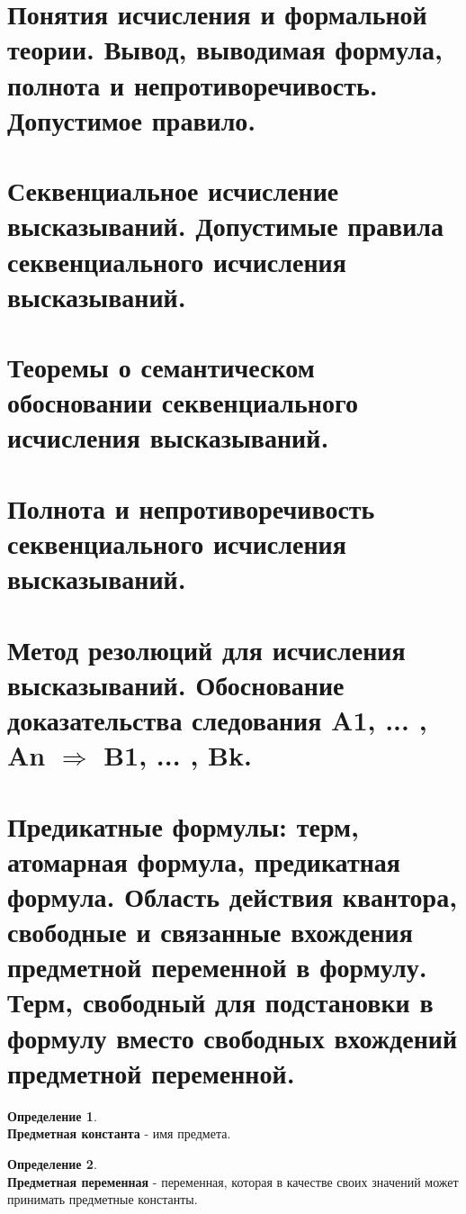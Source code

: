 \documentclass[a4paper,12pt]{article}
\theoremstyle{definition} %
\newtheorem{definition}{Определение}[section]
\theoremstyle{definition} %
\theoremstyle{remark} %
\begin{document}
\section{Понятия исчисления и формальной теории. Вывод, выводимая формула, полнота и непротиворечивость. Допустимое правило.}

\section{Секвенциальное исчисление высказываний. Допустимые правила секвенциального исчисления высказываний.}

\section{Теоремы о семантическом обосновании секвенциального исчисления высказываний.}

\section{Полнота и непротиворечивость секвенциального исчисления высказываний.}

\section{Метод резолюций для исчисления высказываний. Обоснование доказательства следования A1, ... , An $\Rightarrow$ B1, ... , Bk.}

\newpage

\section{Предикатные формулы: терм, атомарная формула, предикатная формула. Область действия квантора, свободные и связанные вхождения предметной переменной в формулу. Терм, свободный для подстановки в формулу вместо свободных вхождений предметной переменной.}

	\begin{definition} \ \\[1ex]
		\textbf{Предметная константа} - имя предмета.
	\end{definition}

	\begin{definition} \ \\[1ex]
		\textbf{Предметная переменная} - переменная, которая в качестве своих значений может принимать предметные константы.
	\end{definition}
\end{document}
